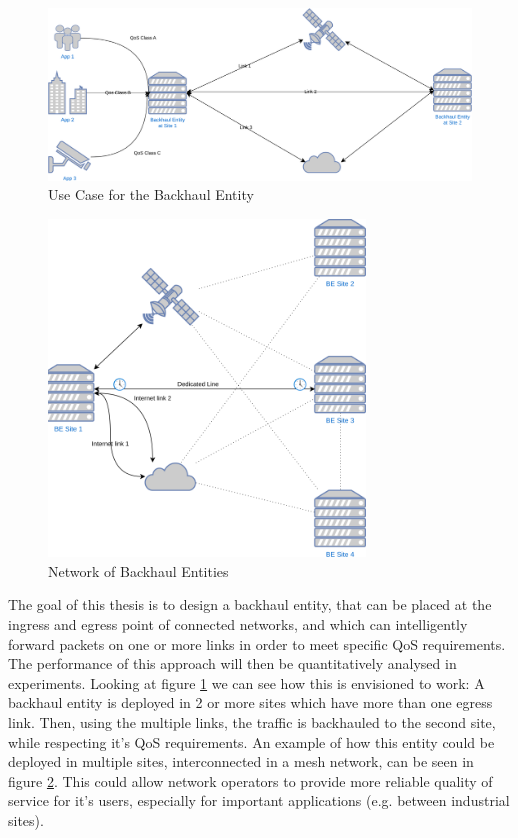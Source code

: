 \begin{figure}[h]
    \centering
        \includegraphics[width=\textwidth]{fig/use_cases.png}
        \caption{Use Case for the Backhaul Entity}
        \label{fig:use}
\end{figure}


\begin{figure}[h]
    \centering
        \includegraphics[width=0.75\textwidth, height=0.75\textwidth]{fig/mesh_network.png}
        \caption{Network of Backhaul Entities}
        \label{fig:mesh}
\end{figure}

The goal of this thesis is to design a backhaul entity, that can be placed at the ingress and egress point of connected networks, and which can intelligently forward packets on one or more links in order to meet specific QoS requirements. The performance of this approach will then be quantitatively analysed in experiments. Looking at figure \ref{fig:use} we can see how this is envisioned to work: A backhaul entity is deployed in 2 or more sites which have more than one egress link. Then, using the multiple links, the traffic is backhauled to the second site, while respecting it's QoS requirements. An example of how this entity could be deployed in multiple sites, interconnected in a mesh network, can be seen in figure \ref{fig:mesh}. This could allow network operators to provide more reliable quality of service for it's users, especially for important applications (e.g. between industrial sites).

